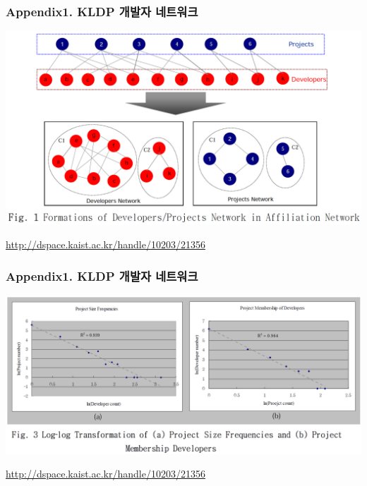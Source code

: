 \documentclass{beamer}
\begin{document}
\begin{frame}[fragile]
\frametitle{Appendix1. KLDP 개발자 네트워크}
\begin{center}
\includegraphics[scale=0.3]{kldp_3.png}
\end{center}
\hfill
\tiny{\href{http://dspace.kaist.ac.kr/handle/10203/21356}{http://dspace.kaist.ac.kr/handle/10203/21356}}
\end{frame}

\begin{frame}[fragile]
\frametitle{Appendix1. KLDP 개발자 네트워크}
\begin{center}
\includegraphics[scale=0.3]{kldp_4.png}
\end{center}
\hfill
\tiny{\href{http://dspace.kaist.ac.kr/handle/10203/21356}{http://dspace.kaist.ac.kr/handle/10203/21356}}
\end{frame}
\end{document}
